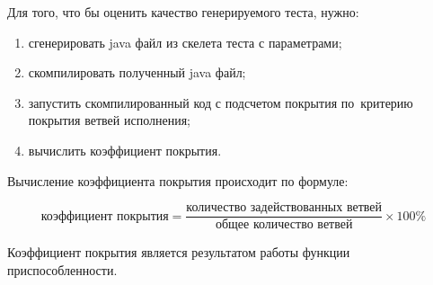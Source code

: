Для того, что бы оценить качество генерируемого теста, нужно:

\begin{enumerate}
	\item сгенерировать java файл из скелета теста с параметрами;
	\item скомпилировать полученный java файл;
	\item запустить скомпилированный код с подсчетом покрытия по~критерию покрытия ветвей исполнения;
	\item вычислить коэффициент покрытия.
\end{enumerate}

Вычисление коэффициента покрытия происходит по формуле:

\[ \text{коэффициент покрытия} = \frac{\text{количество задействованных ветвей}}{\text{общее количество ветвей}}  \times 100 \% \]

Коэффициент покрытия является результатом работы функции приспособленности.
